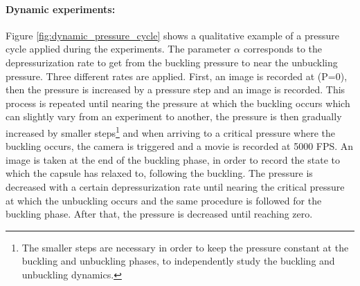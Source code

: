\paragraph{Dynamic experiments:}
Figure \ref{fig:dynamic_pressure_cycle} shows a qualitative example of a pressure cycle applied during the experiments. The parameter $\alpha$ corresponds to the depressurization rate to get from the buckling pressure to near the unbuckling pressure. Three different rates are applied.
First, an image is recorded at (P=0), then the pressure is increased by a pressure step  and an image is recorded. This process is repeated until nearing the pressure at which the buckling occurs which can slightly vary from an experiment to another, the pressure is then gradually increased by smaller steps\footnote{The smaller steps are necessary in order to keep the pressure constant at the buckling and unbuckling phases, to independently study the buckling and unbuckling dynamics.}
 and when arriving to a critical pressure where the buckling occurs, the camera is triggered and a movie is recorded at 5000 FPS. An image is taken at the end of the buckling phase, in order to record the state to which the capsule has relaxed to, following the buckling.
The pressure is decreased with a certain depressurization rate until nearing the critical pressure at which the unbuckling occurs and the same procedure is followed for the buckling phase. After that, the pressure is decreased until reaching zero.

